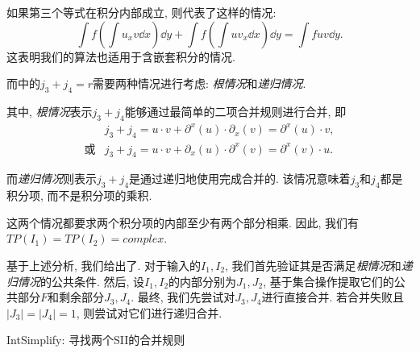如果第三个等式在积分内部成立, 则代表了这样的情况:
\begin{equation}
\int\!{f \left(\int\!{u_x v\dd x}\right)\dd y}+\int\!{f \left(\int\!{u v_x \dd x}\right) \dd y} = \int\!{fuv\dd y}.
\end{equation}
这表明我们的算法也适用于含嵌套积分的情况. 

而中的$j_3+j_4=r$需要两种情况进行考虑: \emph{根情况}和\emph{递归情况}. 

其中, \emph{根情况}表示$j_3+j_4$能够通过最简单的二项合并规则进行合并, 即
\begin{equation}
\begin{array}{rl}
& j_3+j_4=u \cdot v+\partial^x(u)\cdot \partial_x(v) = \partial^x(u)\cdot v, \\
\text{或}& j_3+j_4=u \cdot v+\partial_x(u)\cdot \partial^x(v) = \partial^x(v)\cdot u.
\end{array}
\label{root_form}
\end{equation}

而\emph{递归情况}则表示$j_3+j_4$是通过递归地使用完成合并的. 该情况意味着$j_3$和$j_4$都是积分项, 而不是积分项的乘积.

这两个情况都要求两个积分项的内部至少有两个部分相乘. 因此, 我们有$TP(I_1)=TP(I_2)=complex$.  

基于上述分析, 我们给出了. 对于输入的$I_1,I_2$, 我们首先验证其是否满足\emph{根情况}和\emph{递归情况}的公共条件. 然后, 设$I_1,I_2$的内部分别为$J_1,J_2$, 基于集合操作提取它们的公共部分$F$和剩余部分$J_3,J_4$. 最终, 我们先尝试对$J_3,J_4$进行直接合并. 若合并失败且$|J_3|=|J_4|=1$, 则尝试对它们进行递归合并.  

\begin{algorithm}
\caption{IntSimplify: 寻找两个SII的合并规则}
\label{FindRuleForPair}
\end{algorithm}

